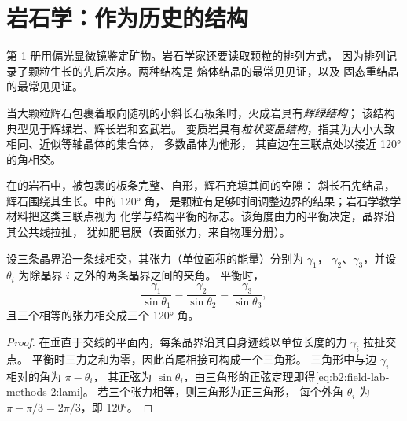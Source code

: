 \section{岩石学：作为历史的结构}\label{sec:b2:field-lab-methods-2:petrography}

第 1 册用偏光显微镜鉴定矿物。岩石学家还要读取颗粒的排列方式，
因为排列记录了颗粒生长的先后次序。两种结构是
熔体结晶的最常见见证，以及
固态重结晶的最常见见证。

\begin{definition}\label{def:b2:field-lab-methods-2:textures}
当大颗粒辉石包裹着取向随机的小斜长石板条时，火成岩具有\emph{辉绿结构}；
该结构典型见于辉绿岩、辉长岩和玄武岩。
变质岩具有\emph{粒状变晶结构}，指其为大小大致相同、近似等轴晶体的集合体，
多数晶体为他形，
其直边在三联点处以接近 \ang{120} 的角相交。
\end{definition}

在的岩石中，被包裹的板条完整、自形，辉石充填其间的空隙：
斜长石先结晶，辉石围绕其生长。中的 \ang{120} 角，
是颗粒有足够时间调整边界的结果；岩石学教学材料把这类三联点视为
化学与结构平衡的标志。该角度由力的平衡决定，晶界沿其公共线拉扯，
犹如肥皂膜（表面张力，来自物理分册）。

\begin{proposition}[三联点处的角]\label{prop:b2:field-lab-methods-2:triple}
设三条晶界沿一条线相交，其张力（单位面积的能量）分别为 $\gamma_1$，
$\gamma_2$、$\gamma_3$，并设 $\theta_i$ 为除晶界 $i$ 之外的两条晶界之间的夹角。
平衡时，
\begin{equation}
\frac{\gamma_1}{\sin\theta_1} = \frac{\gamma_2}{\sin\theta_2} = \frac{\gamma_3}{\sin\theta_3},
\label{eq:b2:field-lab-methods-2:lami}
\end{equation}
且三个相等的张力相交成三个 \ang{120} 角。
\end{proposition}

\begin{proof}
在垂直于交线的平面内，每条晶界沿其自身迹线以单位长度的力 $\gamma_i$ 拉扯交点。
平衡时三力之和为零，因此首尾相接可构成一个三角形。
三角形中与边 $\gamma_i$ 相对的角为 $\pi - \theta_i$，
其正弦为 $\sin\theta_i$，由三角形的正弦定理即得\eqref{eq:b2:field-lab-methods-2:lami}。
若三个张力相等，则三角形为正三角形，
每个外角 $\theta_i$ 为 $\pi - \pi/3 = 2\pi/3$，即 \ang{120}。
\end{proof}

